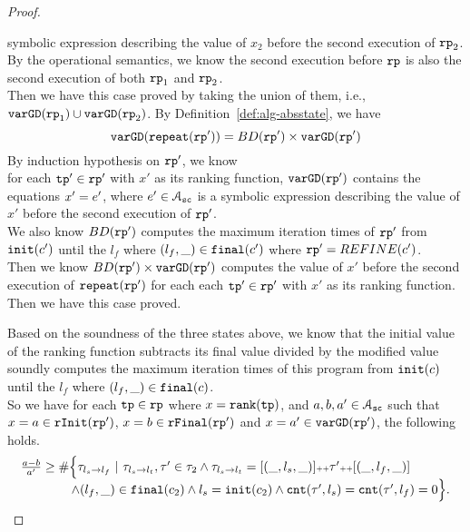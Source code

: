 \begin{proof}
\begin{itemize}
symbolic expression describing the value of $x_2$ before the second execution of $\mathtt{rp}_2$.
\\
By the operational semantics, we know the second execution before $\mathtt{rp}$ is also the second execution of both $\mathtt{rp}_1$ and $\mathtt{rp}_2$.
\\
Then we have this case proved by taking the union of them, i.e., $\mathtt{varGD}(\mathtt{rp}_1) \cup \mathtt{varGD}(\mathtt{rp}_2)$.
 By Definition~\ref{def:alg-absstate}, we have
\[
  \mathtt{varGD}(\mathtt{repeat}(\mathtt{rp}')) =  BD(\mathtt{rp}')  \times
  {\ensuremath{\mathtt{varGD}}(\ensuremath{\mathtt{rp}}')}
\]
By induction hypothesis on $\mathtt{rp}'$, we know
\\
for each $\mathtt{tp}' \in \mathtt{rp}'$ with $x'$ as its ranking function,
$\mathtt{varGD}(\mathtt{rp}')$ contains the equations $x' = e'$, where $e' \in \mathcal{A}_{\mathtt{sc}}$ is a
symbolic expression describing the value of $x'$ before the second execution of $\mathtt{rp}'$.
\\
We also know $BD(\mathtt{rp}')$ computes the maximum iteration times of $\mathtt{rp}'$ from $\mathtt{init}(c')$ until the $l_f$ where $(l_f, \_) \in \mathtt{final}(c')$ where $\mathtt{rp}' = REFINE(c')$.
\\
Then we know $BD(\mathtt{rp}')  \times
{\ensuremath{\mathtt{varGD}}(\ensuremath{\mathtt{rp}}')}$
computes the value of $x'$ before the second execution of $\mathtt{repeat}(\mathtt{rp}')$ for each each $\mathtt{tp}' \in \mathtt{rp}'$ with $x'$ as its ranking function.
\\
Then we have this case proved.
\end{itemize}
Based on the soundness of the three states above, we know that the initial value of the ranking function
subtracts its final value divided by the modified value soundly computes the maximum iteration times of this program from $\mathtt{init}(c)$ until the $l_f$ where $(l_f, \_) \in \mathtt{final}(c)$.
\\
So we have for each $\mathtt{tp} \in \mathtt{rp}$ where $x = \mathtt{rank}(\mathtt{tp})$,
and $a, b, a ' \in \mathcal{A}_{\mathtt{sc}}$
such that $x = a \in \mathtt{rInit}(\mathtt{rp}')$, $x = b \in \mathtt{rFinal}(\mathtt{rp}')$ and $x = a' \in \mathtt{varGD}(\mathtt{rp}')$,
the following holds.
\[
  \begin{array}{l}
  \frac{a - b}{a'} \geq
    \# \Big\{\mathtt{\tau}_{l_s \to l_f} ~\vert~ \mathtt{\tau}_{l_s \to l_t}, \mathtt{\tau}' \in \mathtt{\tau}_2 \land \mathtt{\tau}_{l_s \to l_t} = [(\_, l_s, \_)] {\scriptscriptstyle ++} \mathtt{\tau}' {\scriptscriptstyle ++} [(\_, l_f, \_)]
    \\ \qquad \qquad
    \land (l_{f}, \_) \in \mathtt{final}(c_2)
    \land l_s = \mathtt{init}(c_2)
    \land \mathtt{cnt}(\mathtt{\tau}', l_s) = \mathtt{cnt}(\mathtt{\tau}', l_f) = 0 
    \Big\}.
    \end{array}
\]
\end{proof}

